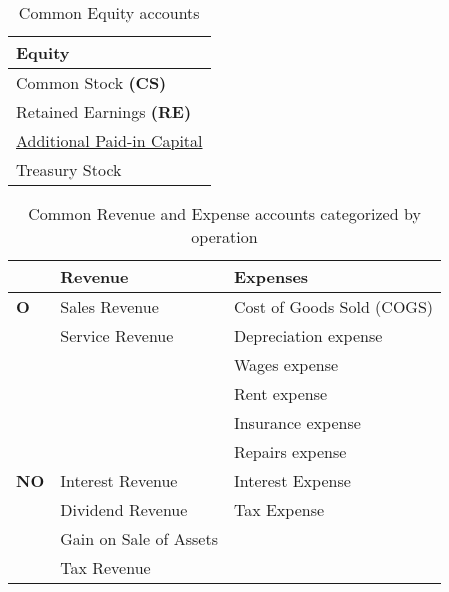 \begin{table}[H]
    \centering
    \begin{tabular}{|p{}|}
        \hline
        \textbf{Equity}                                 \\
        \hline
        Common Stock \textbf{(CS)}                      \\
        Retained Earnings \textbf{(RE)}                 \\
        \hyperref[def:apic]{Additional Paid-in Capital} \\
        Treasury Stock                                  \\
        \hline
    \end{tabular}
    \caption{Common Equity accounts}
\end{table}

\begin{table}[H]
    \centering
    \begin{tabular}{|l|p{}|p{}|}
        \hline
                    & \textbf{Revenue}       & \textbf{Expenses}         \\
        \hline
        \textbf{O}  & Sales Revenue          & Cost of Goods Sold (COGS) \\
                    & Service Revenue        & Depreciation expense      \\
                    &                        & Wages expense             \\
                    &                        & Rent expense              \\
                    &                        & Insurance expense         \\
                    &                        & Repairs expense           \\
        \hline
        \textbf{NO} & Interest Revenue       & Interest Expense          \\
                    & Dividend Revenue       & Tax Expense               \\
                    & Gain on Sale of Assets &                           \\
                    & Tax Revenue            &                           \\
        \hline
    \end{tabular}
    \caption{Common Revenue and Expense accounts categorized by operation}
\end{table}

